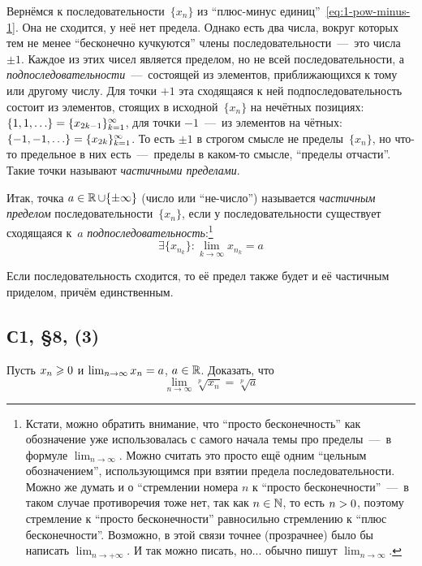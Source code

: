 \documentclass[a4paper,12pt]{article}
\begin{document}
  Вернёмся к последовательности~$\{x_n\}$ из ``плюс-минус единиц''~\eqref{eq:1-pow-minus-1}.
  Она не сходится, у неё нет предела.
  Однако есть два числа, вокруг которых тем не менее ``бесконечно кучкуются'' члены последовательности~---~это числа $\pm 1$.
  Каждое из этих чисел является пределом, но не всей последовательности, а \emph{подпоследовательности}~---~состоящей из элементов, приближающихся к тому или другому числу.
  Для точки ${+1}$ эта сходящаяся к ней подпоследовательность состоит из элементов, стоящих в исходной~$\{x_n\}$ на нечётных позициях: $\{1, 1, \ldots\} \hm= \{x_{2k - 1}\}_{k = 1}^{\infty}$, для точки ${-}1$~---~из элементов на чётных: $\{-1, -1, \ldots\} \hm= \{x_{2k}\}_{k = 1}^{\infty}$.
  То есть $\pm 1$ в строгом смысле не пределы~$\{x_n\}$, но что-то предельное в них есть~---~пределы в каком-то смысле, ``пределы отчасти''.
  Такие точки называют \emph{частичными пределами}.  %

  Итак, точка $a \hm\in \RR \hm\cup \{\pm \infty\}$ (число или ``не-число'') называется \emph{частичным пределом} последовательности~$\{x_n\}$, если у последовательности существует сходящаяся к~$a$ \emph{подпоследовательность}:\footnote{
    Кстати, можно обратить внимание, что ``просто бесконечность'' как обозначение уже использовалась с самого начала темы про пределы~---~в формуле $\lim_{n \to \infty}$.
    Можно считать это просто ещё одним ``цельным обозначением'', использующимся при взятии предела последовательности.
    Можно же думать и о ``стремлении номера $n$ к ``просто бесконечности''~---~в таком случае противоречия тоже нет, так как $n \hm\in \NN$, то есть $n \hm> 0$, поэтому стремление к ``просто бесконечности'' равносильно стремлению к ``плюс бесконечности''.
    Возможно, в этой связи точнее (прозрачнее) было бы написать $\lim_{n \to +\infty}$.
    И так можно писать, но... обычно пишут $\lim_{n \to \infty}$. 
  }
  \[
    \exists \{x_{n_k}\}\colon \lim_{k \to \infty} x_{n_k} = a
  \]
  
  Если последовательность сходится, то её предел также будет и её частичным приделом, причём единственным.
  
  
  \subsection{С1, \S 8, (3)}
  
  Пусть $x_n \hm\geq 0$ и $\lim_{n \to \infty} x_n \hm= a$, $a \hm\in \RR$.
  Доказать, что
  \[
    \lim_{n \to \infty} \sqrt[p]{x_n} = \sqrt[p]{a}
  \]
  
\end{document}
